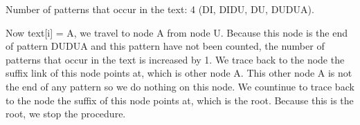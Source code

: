 \begin{center}

\end{center}
Number of patterns that occur in the text: 4 (DI, DIDU, DU, DUDUA).

Now text[i] = A, we travel to node A from node U. Because this node is the end of pattern DUDUA and this pattern have not been counted, the number of patterns that occur in the text is increased by 1. We trace back to the node the suffix link of this node points at, which is other node A. This other node A is not the end of any pattern so we do nothing on this node. We countinue to trace back to the node the suffix of this node points at, which is the root. Because this is the root, we stop the procedure.
\pagebreak

